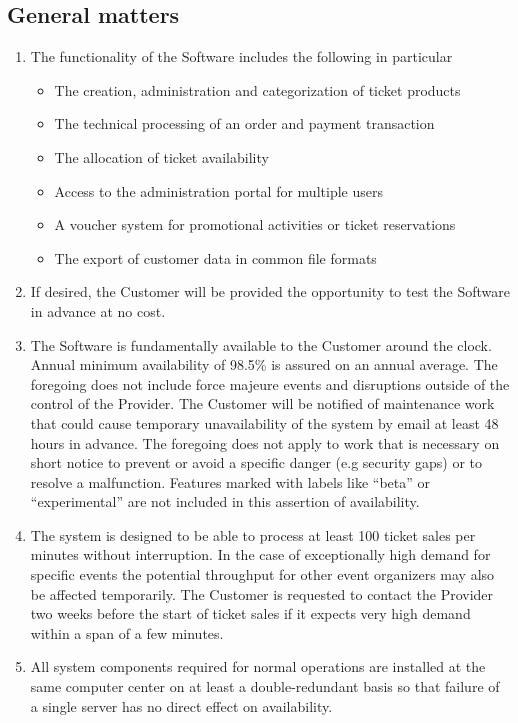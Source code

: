 \documentclass{terms}
\begin{document}
\subsection{General matters}
\begin{enumerate}
\item The functionality of the Software includes the following in particular \begin{itemize}
\item The creation, administration and categorization of ticket products 
\item The technical processing of an order and payment transaction 
\item The allocation of ticket availability 
\item Access to the administration portal for multiple users 
\item A voucher system for promotional activities or ticket reservations 
\item The export of customer data in common file formats
\end{itemize}
\item If desired, the Customer will be provided the opportunity to test the Software in advance at no cost.
\item The Software is fundamentally available to the Customer around the clock. Annual minimum availability of 98.5\% is assured on an annual average. The foregoing does not include force majeure events and disruptions outside of the control of the Provider. The Customer will be notified of maintenance work that could cause temporary unavailability of the system by email at least 48 hours in advance. The foregoing does not apply to work that is necessary on short notice to prevent or avoid a specific danger (e.g security gaps) or to resolve a malfunction. Features marked with labels like “beta” or “experimental” are not included in this assertion of availability.
\item The system is designed to be able to process at least 100 ticket sales per minutes without interruption. In the case of exceptionally high demand for specific events the potential throughput for other event organizers may also be affected temporarily. The Customer is requested to contact the Provider two weeks before the start of ticket sales if it expects very high demand within a span of a few minutes.
\item All system components required for normal operations are installed at the same computer center on at least a double-redundant basis so that failure of a single server has no direct effect on availability.

\end{enumerate}
\end{document}

